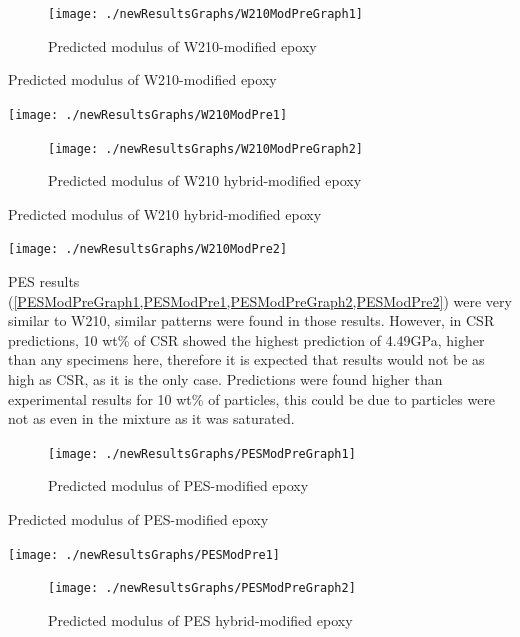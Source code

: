 \documentclass[numbers=noendperiod,chapterprefix=on]{icldt} %
\begin{document}
\begin{figure}[!hp]
\centering
\texttt{[image: ./newResultsGraphs/W210ModPreGraph1]}
\caption{Predicted modulus of W210-modified epoxy}
\label{W210ModPreGraph1}
\end{figure}
\FloatBarrier

\begin{table}[!htpb]
\centering
\caption{Predicted modulus of W210-modified epoxy} \label{W210ModPre1}
\texttt{[image: ./newResultsGraphs/W210ModPre1]}
\end{table}
\FloatBarrier

\begin{figure}[!t]
\centering
\texttt{[image: ./newResultsGraphs/W210ModPreGraph2]}
\caption{Predicted modulus of W210 hybrid-modified epoxy}
\label{W210ModPreGraph2}
\end{figure}
\FloatBarrier

\begin{table}[!hp]
\centering
\caption{Predicted modulus of W210 hybrid-modified epoxy} \label{W210ModPre2}
\texttt{[image: ./newResultsGraphs/W210ModPre2]}
\end{table}
\FloatBarrier

PES results (\ref{PESModPreGraph1,PESModPre1,PESModPreGraph2,PESModPre2}) were very similar to W210, similar patterns were found in those results. However, in CSR predictions, 10 wt\% of CSR showed the highest prediction of 4.49GPa, higher than any specimens here, therefore it is expected that results would not be as high as CSR, as it is the only case. Predictions were found higher than experimental results for 10 wt\% of particles, this could be due to particles were not as even in the mixture as it was saturated.

\begin{figure}[!t]
\centering
\texttt{[image: ./newResultsGraphs/PESModPreGraph1]}
\caption{Predicted modulus of PES-modified epoxy}\label{PESModPreGraph1}
\end{figure}
\FloatBarrier

\begin{table}[!htpb]
\centering
\caption{Predicted modulus of PES-modified epoxy} \label{PESModPre1}
\texttt{[image: ./newResultsGraphs/PESModPre1]}
\end{table}
\FloatBarrier

\begin{figure}[!hp]
\centering
\texttt{[image: ./newResultsGraphs/PESModPreGraph2]}
\caption{Predicted modulus of PES hybrid-modified epoxy}\label{PESModPreGraph2}
\end{figure}
\end{document}

